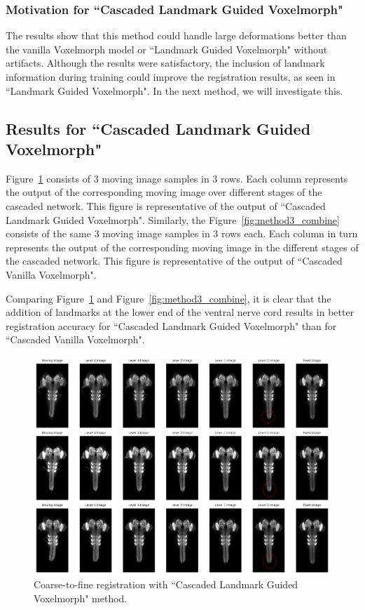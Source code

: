 \documentclass{book}
\begin{document}
	\subsubsection{Motivation for ``Cascaded Landmark Guided Voxelmorph"}
	The results show that this method could handle large deformations better than the vanilla Voxelmorph model or ``Landmark Guided Voxelmorph" without artifacts. Although the results were satisfactory, the inclusion of landmark information during training could improve the registration results, as seen in ``Landmark Guided Voxelmorph". In the next method, we will investigate this.
	
	\subsection{Results for ``Cascaded Landmark Guided Voxelmorph"}
	Figure~\ref{fig:method4_combine} consists of 3 moving image samples in 3 rows. Each column represents the output of the corresponding moving image over different stages of the cascaded network. This figure is representative of the output of ``Cascaded Landmark Guided Voxelmorph". Similarly, the Figure~\ref{fig:method3_combine} consists of the same 3 moving image samples in 3 rows each. Each column in turn represents the output of the corresponding moving image in the different stages of the cascaded network. This figure is representative of the output of ``Cascaded Vanilla Voxelmorph".
	
	Comparing Figure~\ref{fig:method4_combine} and Figure~\ref{fig:method3_combine}, it is clear that the addition of landmarks at the lower end of the ventral nerve cord results in better registration accuracy for ``Cascaded Landmark Guided Voxelmorph" than for ``Cascaded Vanilla Voxelmorph".
	
	\begin{figure}[h!]
		\centering
		\includegraphics[width=\columnwidth]{resources/chapter4/method4/ldm/registered_images.png}
		\caption{Coarse-to-fine registration with ``Cascaded Landmark Guided Voxelmorph" method.}
		\label{fig:method4_combine}
	\end{figure}
	
\end{document}
